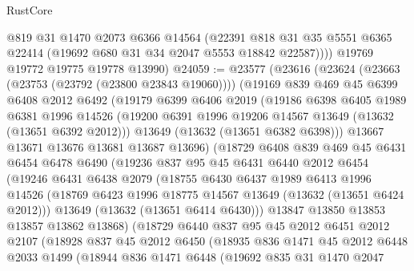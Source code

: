 \begin{lexlean}{RustCore}
\begin{coremodule}
          @819
          @31
          @1470
          @2073
          @6366
          @14564
          (@22391 @818 @31 @35 @5551 @6365 @22414 (@19692 @680 @31 @34 @2047 @5553 @18842 @22587))))
      @19769
      @19772
      @19775
      @19778
      @13990)
@24059 := @23577
    (@23616
      (@23624
        (@23663 (@23753 (@23792 (@23800 @23843 @19060))))
        (@19169
          @839
          @469
          @45
          @6399
          @6408
          @2012
          @6492
          (@19179
            @6399
            @6406
            @2019
            (@19186
              @6398
              @6405
              @1989
              @6381
              @1996
              @14526
              (@19200 @6391 @1996 @19206 @14567 @13649 (@13632 (@13651 @6392 @2012)))
              @13649
              (@13632 (@13651 @6382 @6398)))
            @13667
            @13671
            @13676
            @13681
            @13687
            @13696)
          (@18729
            @6408
            @839
            @469
            @45
            @6431
            @6454
            @6478
            @6490
            (@19236
              @837
              @95
              @45
              @6431
              @6440
              @2012
              @6454
              (@19246
                @6431
                @6438
                @2079
                (@18755
                  @6430
                  @6437
                  @1989
                  @6413
                  @1996
                  @14526
                  (@18769 @6423 @1996 @18775 @14567 @13649 (@13632 (@13651 @6424 @2012)))
                  @13649
                  (@13632 (@13651 @6414 @6430)))
                @13847
                @13850
                @13853
                @13857
                @13862
                @13868)
              (@18729
                @6440
                @837
                @95
                @45
                @2012
                @6451
                @2012
                @2107
                (@18928
                  @837
                  @45
                  @2012
                  @6450
                  (@18935
                    @836
                    @1471
                    @45
                    @2012
                    @6448
                    @2033
                    @1499
                    (@18944
                      @836
                      @1471
                      @6448
                      (@19692
                        @835
                        @31
                        @1470
                        @2047

\end{coremodule}
\end{lexlean}
